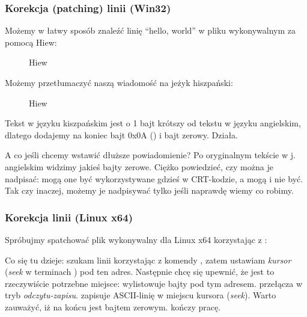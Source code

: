\subsubsection{Korekcja (patching) linii (Win32)}

Możemy w łatwy sposób znaleźć linię ``hello, world'' w pliku wykonywalnym za pomocą Hiew:

\begin{figure}[H]
\centering
{}
\caption{Hiew}
\label{}
\end{figure}

Możemy przetłumaczyć naszą wiadomość na jeżyk hiszpański:

\begin{figure}[H]
\centering
{}
\caption{Hiew}
\label{}
\end{figure}

Tekst w języku kiszpańskim jest o 1 bajt krótszy od tekstu w języku angielskim, dlatego dodajemy na koniec bajt 0x0A () i bajt zerowy.
Działa.

A co jeśli chcemy wstawić dłuższe powiadomienie?
Po oryginalnym tekście w j. angielskim widzimy jakieś bajty zerowe.
Ciężko powiedzieć, czy można je nadpisać: mogą one być wykorzystywane gdzieś w \ac{CRT}-kodzie, a mogą i nie być.
Tak czy inaczej, możemy je nadpisywać tylko jeśli naprawdę wiemy co robimy.

\subsubsection{Korekcja linii (Linux x64)}

\myindex{\radare}
Spróbujmy spatchować plik wykonywalny dla Linux x64 korzystając z \radare{}:



Co się tu dzieje: szukam linii  korzystając z komendy \TT{/}, 
zatem ustawiam \emph{kursor} (\emph{seek} w terminach \radare{}) pod ten adres.
Następnie chcę się upewnić, że jest to rzeczywiście potrzebne miejsce:  wylistowuje bajty pod tym adresem.
 przełącza \radare{} w tryb \emph{odczytu-zapisu}.
 zapisuje ASCII-linię w miejscu kursora (\emph{seek}).
Warto zauważyć, iż  na końcu jest bajtem zerowym.
 kończy pracę.

%


